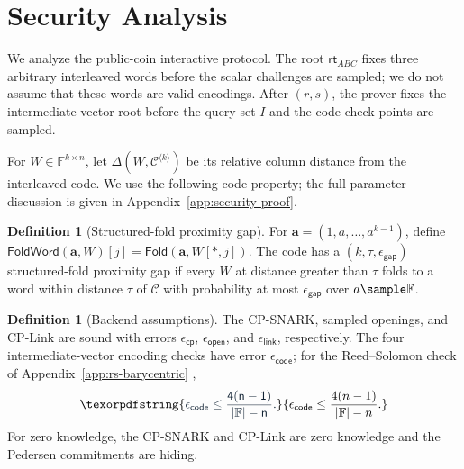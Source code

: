 \documentclass[conference,compsoc]{IEEEtran}
\newcommand{\rt}{\textsf{rt}}
\newcommand{\vect}{\mathbf}         %
\newcommand{\fold}{\textsf{Fold}}
\theoremstyle{plain}
\theoremstyle{definition}
\newtheorem{definition}[theorem]{Definition}
\theoremstyle{remark}
\providecommand{\DIFaddtex}[1]{{\protect\color{DIFADD} \sf #1}} %
\providecommand{\DIFaddbegin}{} %
\providecommand{\DIFaddend}{} %
\providecommand{\DIFadd}[1]{\texorpdfstring{\DIFaddtex{#1}}{#1}} %
\providecommand{\DIFaddincludegraphics}[2][]{{\color{blue}\fbox{\DIFOincludegraphics[#1]{#2}}}} %
\DeclareRobustCommand{\DIFaddbegin}{\DIFOaddbegin \let\includegraphics\DIFaddincludegraphics} %
\DeclareRobustCommand{\DIFaddend}{\DIFOaddend \let\includegraphics\DIFOincludegraphics} %
\begin{document}
\section{Security Analysis}
\label{sec:security}

We  \DIFaddbegin \DIFadd{analyze }\DIFaddend the public-coin interactive  \DIFaddbegin \DIFadd{protocol.  The }\DIFaddend root \(\rt_{ABC}\)
 \DIFaddbegin \DIFadd{fixes three arbitrary interleaved words before the scalar challenges are
sampled; we do not assume that these words are valid encodings.  After
\((r,s)\)}\DIFaddend , the prover  \DIFaddbegin \DIFadd{fixes }\DIFaddend the intermediate-vector  \DIFaddbegin \DIFadd{root before the query set
}\DIFaddend \(I\) and the code-check points  \DIFaddbegin \DIFadd{are sampled}\DIFaddend .

 \DIFaddbegin \DIFadd{For \(W\in\mathbb{F}^{k\times n}\), let
\(\Delta(W,\mathcal{C}^{\langle k\rangle})\) be its relative column distance
from the interleaved code.  We use the following code property; the full
parameter discussion is given in Appendix~\ref{app:security-proof}.
}

\begin{definition}[Structured-fold proximity gap]
\label{def:structured-proximity-gap}
\DIFadd{For \(\vect{a}=(1,a,\ldots,a^{k-1})\), define
\(\mathsf{FoldWord}(\vect{a},W)[j]=\fold(\vect{a},W[*,j])\).  The code has a
\((k,\tau,\epsilon_{\mathsf{gap}})\) structured-fold proximity gap if every
\(W\) at distance greater than \(\tau\) folds to a word within distance
\(\tau\) of \(\mathcal{C}\) }\DIFaddend with probability at most
 \DIFaddbegin \DIFadd{\(\epsilon_{\mathsf{gap}}\) over \(a\sample\mathbb{F}\).
}\end{definition}
\DIFaddend 

 \DIFaddbegin \begin{definition}[Backend assumptions]
\label{def:lamp-backend-assumptions}
\DIFadd{The CP-SNARK, sampled openings, and CP-Link are sound with errors
\(\epsilon_{\mathsf{cp}}\), \(\epsilon_{\mathsf{open}}\), and
\(\epsilon_{\mathsf{link}}\), respectively.  The four intermediate-vector
encoding checks have error \(\epsilon_{\mathsf{code}}\); for }\DIFaddend the
Reed--Solomon  \DIFaddbegin \DIFadd{check of }\DIFaddend Appendix~\ref{app:rs-barycentric} \DIFaddbegin \DIFadd{,
}\[
  \DIFadd{\epsilon_{\mathsf{code}}
  \le \frac{4(n-1)}{|\mathbb{F}|-n}.
}\]
\DIFadd{For zero knowledge, the CP-SNARK and CP-Link are zero knowledge and the
Pedersen commitments are hiding.
}\DIFaddend \end{definition}
\end{document}
